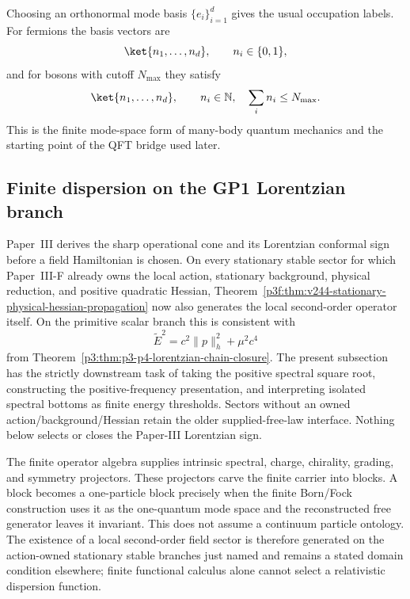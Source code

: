 \documentclass[12pt,a4paper]{article}
\begin{document}
Choosing an orthonormal mode basis $\{e_i\}_{i=1}^d$ gives the usual occupation labels.
For fermions the basis vectors are
\[
\ket{n_1,\dots,n_d},
\qquad
n_i\in\{0,1\},
\]
and for bosons with cutoff $N_{\max}$ they satisfy
\[
\ket{n_1,\dots,n_d},
\qquad
n_i\in\mathbb N,
\quad
\sum_i n_i\le N_{\max}.
\]
This is the finite mode-space form of many-body quantum mechanics and the starting point of the QFT bridge used later.



\subsection{Finite dispersion on the GP1 Lorentzian branch}
\label{p4:sec:finite-one-particle-dispersion}

Paper~III derives the sharp operational cone and its Lorentzian conformal sign
before a field Hamiltonian is chosen.  On every stationary stable sector for
which Paper~III-F already owns the local action, stationary background,
physical reduction, and positive quadratic Hessian,
Theorem~\ref{p3f:thm:v244-stationary-physical-hessian-propagation} now also
generates the local second-order operator itself.  On the primitive scalar
branch this is consistent with
\[
\widetilde E^2=c^2\|p\|_h^2+\mu^2c^4
\]
from Theorem~\ref{p3:thm:p3-p4-lorentzian-chain-closure}.  The present
subsection has the strictly downstream task of taking the positive spectral
square root, constructing the positive-frequency presentation, and
interpreting isolated spectral bottoms as finite energy thresholds.  Sectors
without an owned action/background/Hessian retain the older supplied-free-law
interface.  Nothing below selects or closes the Paper-III Lorentzian sign.

The finite operator algebra supplies intrinsic spectral, charge, chirality,
grading, and symmetry projectors.  These projectors carve the finite carrier
into blocks.  A block becomes a one-particle block precisely when the finite
Born/Fock construction uses it as the one-quantum mode space and the
reconstructed free generator leaves it invariant.  This does not assume a
continuum particle ontology.  The existence of a local second-order field sector is therefore generated on
the action-owned stationary stable branches just named and remains a stated
domain condition elsewhere; finite functional calculus alone cannot select a
relativistic dispersion function.
\end{document}
